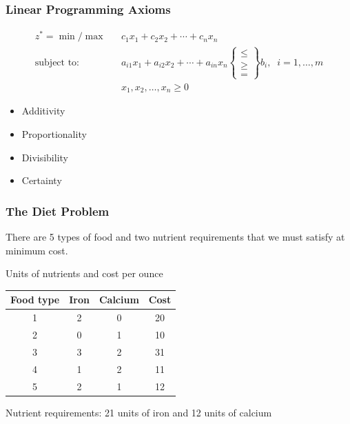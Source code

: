 \documentclass[12pt,handout]{beamer}
\begin{document}
\begin{frame}
\frametitle{Linear Programming Axioms}
\begin{eqnarray}
z^* = \min / \max && c_1 x_1 + c_2 x_2 + \cdots + c_n x_n \nonumber \\
\mbox{subject to:} &&a_{i1} x_1 + a_{i2} x_2 + \cdots + a_{in} x_n
\begin{Bmatrix}   \le \\
                   \ge \\
                    =
\end{Bmatrix}
b_i,\;\;i = 1,\ldots,m \nonumber \\
&&x_1, x_2, \ldots, x_n \ge 0 \nonumber
\end{eqnarray}
\begin{itemize}
\item Additivity
\item Proportionality
\item Divisibility
\item Certainty
\end{itemize}
\end{frame}

\begin{frame}
\frametitle{The Diet Problem}
There are 5 types of food and two nutrient requirements that we must satisfy at minimum cost.
\begin{center}
Units of nutrients and cost per ounce
\begin{tabular} {c | c | c | c}
Food type & Iron & Calcium & Cost \\
\hline
1 & 2 & 0 & 20 \\
2 & 0 & 1 & 10 \\
3 & 3 & 2 & 31 \\
4 & 1 & 2 & 11 \\
5 & 2 & 1 & 12 \\
\end{tabular}
\end{center}
Nutrient requirements: 21 units of iron and 12 units of calcium
\end{frame}
\end{document}
